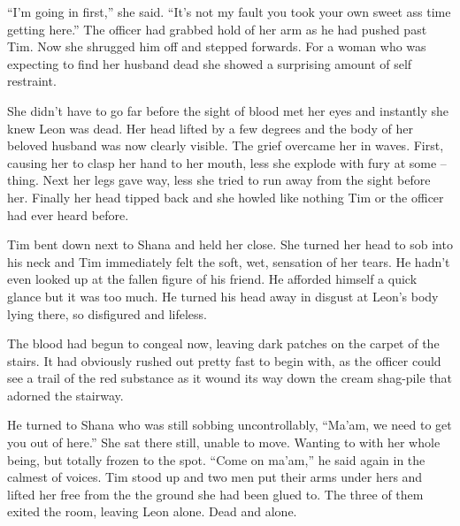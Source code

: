 ``I'm going in first,'' she said.  ``It's not my fault you took your own sweet ass time getting here.''  The officer had grabbed hold of her arm as he had pushed past Tim.  Now she shrugged him off and stepped forwards.  For a woman who was expecting to find her husband dead she showed a surprising amount of self restraint.  

She didn't have to go far before the sight of blood met her eyes and instantly she knew Leon was dead.  Her head lifted by a few degrees and the body of her beloved husband was now clearly visible.  The grief overcame her in waves.  First, causing her to clasp her hand to her mouth, less she explode with fury at some – thing.  Next her legs gave way, less she tried to run away from the sight before her.  Finally her head tipped back and she howled like nothing Tim or the officer had ever heard before. 

Tim bent down next to Shana and held her close.  She turned her head to sob into his neck and Tim immediately felt the soft, wet, sensation of her tears.  He hadn't even looked up at the fallen figure of his friend.  He afforded himself a quick glance but it was too much.  He turned his head away in disgust at Leon's body lying there, so disfigured and lifeless.

The blood had begun to congeal now, leaving dark patches on the carpet of the stairs.  It had obviously rushed out pretty fast to begin with, as the officer could see a trail of the red substance as it wound its way down the cream shag-pile that adorned the stairway.  

He turned to Shana who was still sobbing uncontrollably, ``Ma'am, we need to get you out of here.''  She sat there still, unable to move.  Wanting to with her whole being, but totally frozen to the spot.  ``Come on ma'am,'' he said again in the calmest of voices.  Tim stood up and two men put their arms under hers and lifted her free from the the ground she had been glued to.  The three of them exited the room, leaving Leon alone.  Dead and alone.



